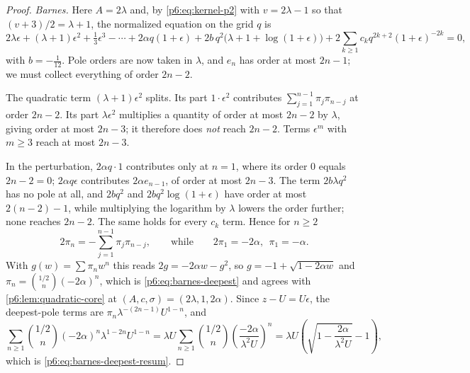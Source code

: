 \documentclass[11pt,a4paper,oneside]{book}
\theoremstyle{plain}
\theoremstyle{definition}
\theoremstyle{remark}
\begin{document}
\begin{proof}
\emph{Barnes.}  Here $A=2\lambda$ and, by \eqref{p6:eq:kernel-p2} with
$v=2\lambda-1$ so that $(v+3)/2=\lambda+1$, the normalized equation on the
grid $q$ is
\begin{equation}\label{p6:eq:barnes-normalized-again}
 2\lambda\epsilon+(\lambda+1)\epsilon^{2}+\tfrac13\epsilon^{3}-\cdots
 +2\alpha q(1+\epsilon)
 +2b\,q^{2}\bigl(\lambda+1+\log(1+\epsilon)\bigr)
 +2\sum_{k\ge1}c_kq^{2k+2}(1+\epsilon)^{-2k}=0,
\end{equation}
with $b=-\tfrac1{12}$.  Pole orders are now taken in $\lambda$, and
$e_n$ has order at most $2n-1$; we must collect everything of order $2n-2$.

The quadratic term $(\lambda+1)\epsilon^{2}$ splits.  Its part $1\cdot
\epsilon^{2}$ contributes $\sum_{j=1}^{n-1}\pi_j\pi_{n-j}$ at order $2n-2$.
Its part $\lambda\epsilon^{2}$ multiplies a quantity of order at most $2n-2$
by $\lambda$, giving order at most $2n-3$; it therefore does \emph{not}
reach $2n-2$.  Terms $\epsilon^{m}$ with $m\ge3$ reach at most $2n-3$.

In the perturbation, $2\alpha q\cdot1$ contributes only at $n=1$, where its
order $0$ equals $2n-2=0$; $2\alpha q\epsilon$ contributes $2\alpha e_{n-1}$,
of order at most $2n-3$.  The term $2b\lambda q^{2}$ has no pole at all, and
$2bq^{2}$ and $2bq^{2}\log(1+\epsilon)$ have order at most $2(n-2)-1$, while
multiplying the logarithm by $\lambda$ lowers the order further; none reaches
$2n-2$.  The same holds for every $c_k$ term.  Hence for $n\ge2$
\[
 2\pi_n=-\sum_{j=1}^{n-1}\pi_j\pi_{n-j},
 \qquad\text{while}\qquad 2\pi_1=-2\alpha,\ \ \pi_1=-\alpha .
\]
With $g(w)=\sum\pi_nw^{n}$ this reads $2g=-2\alpha w-g^{2}$, so
$g=-1+\sqrt{1-2\alpha w}$ and $\pi_n=\binom{1/2}{n}(-2\alpha)^{n}$, which is
\eqref{p6:eq:barnes-deepest} and agrees with \cref{p6:lem:quadratic-core} at
$(A,c,\sigma)=(2\lambda,1,2\alpha)$.  Since $z-U=U\epsilon$, the deepest-pole
terms are $\pi_n\lambda^{-(2n-1)}U^{1-n}$, and
\[
 \sum_{n\ge1}\binom{1/2}{n}(-2\alpha)^{n}\lambda^{1-2n}U^{1-n}
 =\lambda U\sum_{n\ge1}\binom{1/2}{n}
   \left(\frac{-2\alpha}{\lambda^{2}U}\right)^{n}
 =\lambda U\left(\sqrt{1-\frac{2\alpha}{\lambda^{2}U}}-1\right),
\]
which is \eqref{p6:eq:barnes-deepest-resum}.
\end{proof}
\end{document}

